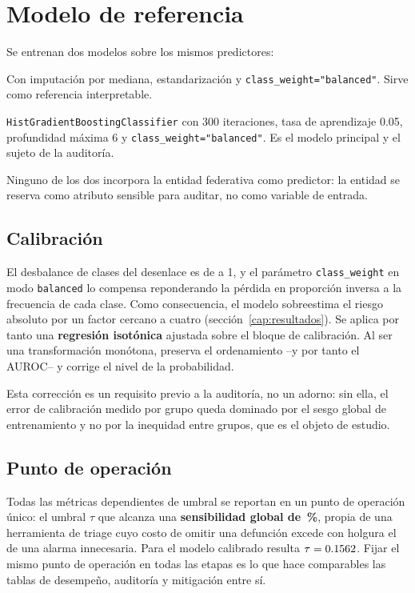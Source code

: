 \section{Modelo de referencia}

Se entrenan dos modelos sobre los mismos predictores:

\begin{description}[leftmargin=*,style=nextline]
  \item[Regresión logística] Con imputación por mediana, estandarización y
    \texttt{class\_weight="balanced"}. Sirve como referencia interpretable.
  \item[Impulso del gradiente por histogramas] \texttt{HistGradientBoosting\-Classifier}
    con 300 iteraciones, tasa de aprendizaje 0.05, profundidad máxima 6 y
    \texttt{class\_weight="balanced"}. Es el modelo principal y el sujeto de la
    auditoría.
\end{description}

Ninguno de los dos incorpora la entidad federativa como predictor: la entidad se
reserva como atributo sensible para auditar, no como variable de entrada.

\subsection{Calibración}

El desbalance de clases del desenlace es de \desbalance{} a 1, y el parámetro
\texttt{class\_weight} en modo \texttt{balanced} lo compensa reponderando la
pérdida en proporción inversa a la frecuencia de cada clase. Como
consecuencia, el modelo sobreestima el riesgo absoluto por un factor cercano a
cuatro (sección~\ref{cap:resultados}). Se aplica por tanto una \textbf{regresión isotónica} ajustada sobre el
bloque de calibración. Al ser una transformación monótona, preserva el
ordenamiento --y por tanto el AUROC-- y corrige el nivel de la probabilidad.

Esta corrección es un requisito previo a la auditoría, no un adorno: sin ella, el
error de calibración medido por grupo queda dominado por el sesgo global de
entrenamiento y no por la inequidad entre grupos, que es el objeto de estudio.

\subsection{Punto de operación}

Todas las métricas dependientes de umbral se reportan en un punto de operación
único: el umbral $\tau$ que alcanza una \textbf{sensibilidad global de
\sensObjetivo\,\%}, propia de una herramienta de triage cuyo costo de omitir una
defunción excede con holgura el de una alarma innecesaria. Para el modelo
calibrado resulta $\tau=0.1562$. Fijar el mismo punto de operación en
todas las etapas es lo que hace comparables las tablas de desempeño, auditoría y
mitigación entre sí.

